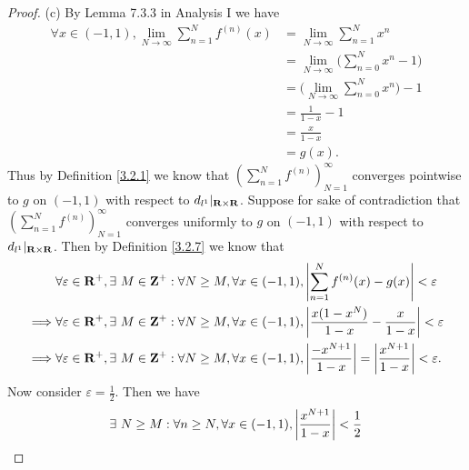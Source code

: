 \begin{proof}{(c)}
    By Lemma 7.3.3 in Analysis I we have
    \begin{align*}
        \forall x \in (-1, 1), \lim_{N \to \infty} \sum_{n = 1}^N f^{(n)}(x) & = \lim_{N \to \infty} \sum_{n = 1}^N x^n                 \\
                                                                             & = \lim_{N \to \infty} \bigg(\sum_{n = 0}^N x^n - 1\bigg) \\
                                                                             & = \bigg(\lim_{N \to \infty} \sum_{n = 0}^N x^n\bigg) - 1 \\
                                                                             & = \frac{1}{1 - x} - 1                                    \\
                                                                             & = \frac{x}{1 - x}                                        \\
                                                                             & = g(x).
    \end{align*}
    Thus by Definition \ref{3.2.1} we know that \((\sum_{n = 1}^N f^{(n)})_{N = 1}^\infty\) converges pointwise to \(g\) on \((-1, 1)\) with respect to \(d_{l^1}|_{\mathbf{R} \times \mathbf{R}}\).
    Suppose for sake of contradiction that \((\sum_{n = 1}^N f^{(n)})_{N = 1}^\infty\) converges uniformly to \(g\) on \((-1, 1)\) with respect to \(d_{l^1}|_{\mathbf{R} \times \mathbf{R}}\).
    Then by Definition \ref{3.2.7} we know that
    \begin{align*}
                 & \forall \varepsilon \in \mathbf{R}^+, \exists\ M \in \mathbf{Z}^+ : \forall N \geq M, \forall x \in (-1, 1), \left\lvert\sum_{n = 1}^N f^{(n)}(x) - g(x)\right\rvert < \varepsilon                          \\
        \implies & \forall \varepsilon \in \mathbf{R}^+, \exists\ M \in \mathbf{Z}^+ : \forall N \geq M, \forall x \in (-1, 1), \left\lvert\frac{x(1 - x^N)}{1 - x} - \frac{x}{1 - x}\right\rvert < \varepsilon                \\
        \implies & \forall \varepsilon \in \mathbf{R}^+, \exists\ M \in \mathbf{Z}^+ : \forall N \geq M, \forall x \in (-1, 1), \left\lvert\frac{-x^{N + 1}}{1 - x}\right\rvert = \left\lvert\frac{x^{N + 1}}{1 - x}\right\rvert < \varepsilon.
    \end{align*}
    Now consider \(\varepsilon = \frac{1}{2}\).
    Then we have
    \begin{align*}
                 & \exists\ N \geq M : \forall n \geq N, \forall x \in (-1, 1), \abs{\frac{x^{N + 1}}{1 - x}} < \frac{1}{2}                                                               \\

\end{align*}
\end{proof}

